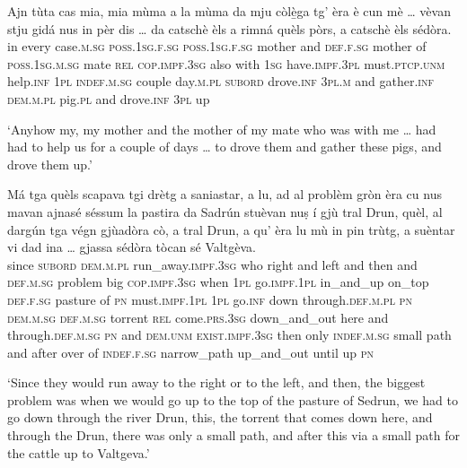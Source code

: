 \begin{linenumbers}
	\gll    Ajn tùta cas mia, mia mùma a la mùma da mju còlè̱ga tg’ èra è cun mè … vèvan stju gidá nus in pèr dis … da catschè èls a rimná quèls pòrs, a catschè èls sédòra.\\
	in every case.\textsc{m.sg} \textsc{poss.1sg.f.sg}  \textsc{poss.1sg.f.sg} mother and \textsc{def.f.sg} mother of  \textsc{poss.1sg.m.sg} mate \textsc{rel}  \textsc{cop.impf.3sg} also with \textsc{1sg} {}  have.\textsc{impf.3pl} must.\textsc{ptcp.unm} help.\textsc{inf} \textsc{1pl} \textsc{indef.m.sg} couple day.\textsc{m.pl} {} \textsc{subord} drove.\textsc{inf} \textsc{3pl.m} and gather.\textsc{inf} \textsc{dem.m.pl} pig.\textsc{pl} and drove.\textsc{inf} \textsc{3pl} up\\
\end{linenumbers}
\medskip
\glt `Anyhow my, my mother and the mother of my mate who was with me … had had to help us for a couple of days … to drove them and gather these pigs, and drove them up.'
\medskip

\begin{linenumbers}
	\gll    Má tga quèls scapava tgi drètg a saniastar, a lu, ad al problèm gròn èra cu nus mavan ajnasé séssum la pastira da Sadrún stuèvan nuṣ í gjù tral Drun, quèl, al dargún tga végn gjùadòra cò, a tral Drun, a qu’ èra lu mù in pin trùtg, a suèntar\footnotemark{} vi dad ina … gjassa sédòra tòcan sé Valtgèva. \\
	since \textsc{subord} \textsc{dem.m.pl} run\_away.\textsc{impf.3sg} who right and left and then and \textsc{def.m.sg} problem big  \textsc{cop.impf.3sg} when \textsc{1pl}  go.\textsc{impf.1pl} in\_and\_up on\_top \textsc{def.f.sg} pasture of \textsc{pn} must.\textsc{impf.1pl}  \textsc{1pl} go.\textsc{inf} down  through.\textsc{def.m.pl} \textsc{pn} \textsc{dem.m.sg} \textsc{def.m.sg} torrent \textsc{rel} come.\textsc{prs.3sg} down\_and\_out here and through.\textsc{def.m.sg} \textsc{pn} and \textsc{dem.unm} \textsc{exist.impf.3sg} then only \textsc{indef.m.sg} small path and after over of \textsc{indef.f.sg} {} narrow\_path up\_and\_out until up \textsc{pn}\\
\end{linenumbers}
\medskip
\glt `Since they would run away to the right or to the left, and then, the biggest problem was when we would go up to the top of the pasture of Sedrun, we had to go down through the river Drun, this, the torrent that comes down here, and through the Drun, there was only a small path, and after this via a small path for the cattle up to Valtgeva.'
\medskip

